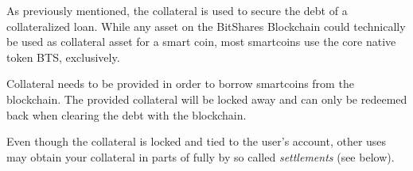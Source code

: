 \label{sec:collateral}

As previously mentioned, the collateral is used to secure the debt of a
collateralized loan. While any asset on the BitShares Blockchain could
technically be used as collateral asset for a smart coin, most smartcoins
use the core native token BTS, exclusively.

Collateral needs to be provided in order to borrow smartcoins from the
blockchain. The provided collateral will be locked away and can only be
redeemed back when clearing the debt with the blockchain.

Even though the collateral is locked and tied to the user's account, other uses
may obtain your collateral in parts of fully by so called \emph{settlements}
(see below).
